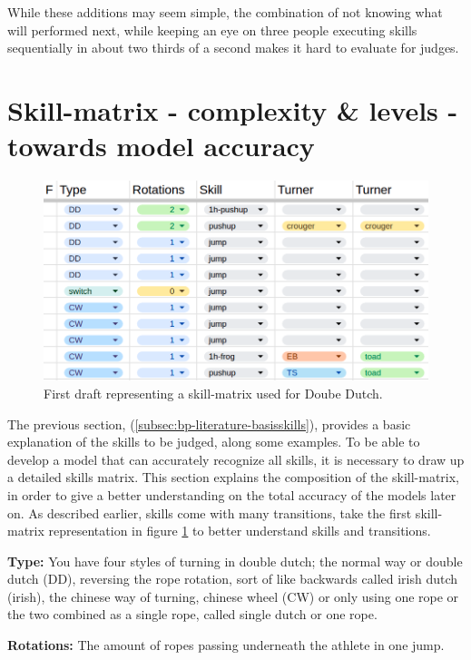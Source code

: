 While these additions may seem simple, the combination of not knowing what will performed next, while keeping an eye on three people executing skills sequentially in about two thirds of a second makes it hard to evaluate for judges.

\section{Skill-matrix - complexity \& levels - towards model accuracy}
\label{subsec:skillcomplexiteit}

\begin{figure}
    \centering
    \includegraphics[width=0.95\linewidth]{img/doubledutch-matrix}
    \caption[skill-matrix-DD]{First draft representing a skill-matrix used for Doube Dutch.}
    \label{fig:doubledutch-skill-matrix}
\end{figure}

The previous section, (\ref{subsec:bp-literature-basisskills}), provides a basic explanation of the skills to be judged, along some examples. To be able to develop a model that can accurately recognize all skills, it is necessary to draw up a detailed skills matrix. This section explains the composition of the skill-matrix, in order to give a better understanding on the total accuracy of the models later on. As described earlier, skills come with many transitions, take the first skill-matrix representation in figure \ref{fig:doubledutch-skill-matrix} to better understand skills and transitions.

\textbf{Type:} You have four styles of turning in double dutch; the normal way or double dutch (DD), reversing the rope rotation, sort of like backwards called irish dutch (irish), the chinese way of turning, chinese wheel (CW) or only using one rope or the two combined as a single rope, called single dutch or one rope.

\textbf{Rotations:} The amount of ropes passing underneath the athlete in one jump.

